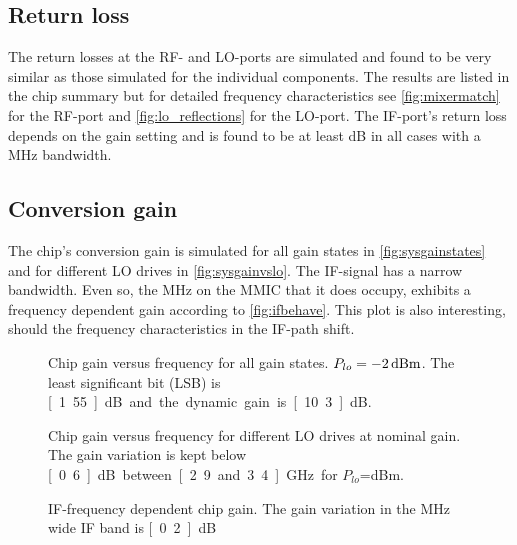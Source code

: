 		\subsection{Return loss}
			The return losses at the RF- and LO-ports are simulated and found to be very similar as those simulated for the individual components. The results are listed in the chip summary but for detailed frequency characteristics see \autoref{fig:mixermatch} for the RF-port and \autoref{fig:lo_reflections} for the LO-port. The IF-port's return loss depends on the gain setting and is found to be at least \unit[21]{dB} in all cases with a \unit[100]{MHz} bandwidth.
			
		\subsection{Conversion gain}
			The chip's conversion gain is simulated for all gain states in \autoref{fig:sysgainstates} and for different LO drives in \autoref{fig:sysgainvslo}. The IF-signal has a narrow bandwidth. Even so, the \unit[20]{MHz} on the MMIC that it does occupy, exhibits a frequency dependent gain according to \autoref{fig:ifbehave}. This plot is also interesting, should the frequency characteristics in the IF-path shift.
			
			\begin{figure}[hbt!]
				\centering
				\caption[Chip gain for all gain states.]{Chip gain versus frequency for all gain states. $P_{lo}=\unit[-2]{dBm}$. The least significant bit (LSB) is \unit[1.55]{dB} and the dynamic gain is \unit[10.3]{dB}.}\label{fig:sysgainstates}
			\end{figure}
			
			\begin{figure}[hbt!]
				\centering
				\caption[Chip gain for different LO drives.]{Chip gain versus frequency for different LO drives at nominal gain. The gain variation is kept below \unit[0.6]{dB} between \unit[2.9 and 3.4]{GHz} for $P_{lo}$=\unit[-4 to 0]{dBm}.}\label{fig:sysgainvslo}
			\end{figure}
			
			\begin{figure}[hbt!]
				\centering
				\caption[IF-frequency dependent chip gain.]{IF-frequency dependent chip gain. The gain variation in the \unit[20]{MHz} wide IF band is \unit[0.2]{dB}}\label{fig:ifbehave}
			\end{figure}
			
